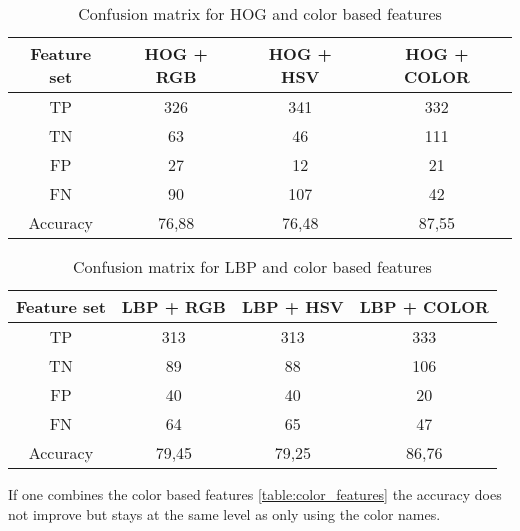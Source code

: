\FloatBarrier
\begin{table}[h!]
	\begin{center}
		\caption{Confusion matrix for HOG and color based features}
		\begin{tabular}{|c|c|c|c|}
			\hline
			Feature set & HOG + RGB & HOG + HSV & HOG + COLOR \\ \hline
			    TP      &    326    &    341    &     332     \\ \hline
			    TN      &    63     &    46     &     111     \\ \hline
			    FP      &    27     &    12     &     21      \\ \hline
			    FN      &    90     &    107    &     42      \\ \hline
			 Accuracy   &   76,88   &   76,48   &    87,55    \\ \hline
		\end{tabular}
		
		\label{table:hog_features}
	\end{center}
\end{table}
\FloatBarrier

\FloatBarrier
\begin{table}[h!]
	\begin{center}
		\caption{Confusion matrix for LBP and color based features}
		\begin{tabular}{|c|c|c|c|}
			\hline
			Feature set & LBP + RGB & LBP + HSV & LBP + COLOR   \\ \hline
			    TP      &    313    &    313    &     333       \\ \hline
			    TN      &    89     &    88     &     106       \\ \hline
			    FP      &    40     &    40     &     20        \\ \hline
			    FN      &    64     &    65     &     47        \\ \hline
			 Accuracy   &   79,45   &   79,25   &    86,76      \\ \hline
		\end{tabular}
		\label{table:lbp_features}
	\end{center}
\end{table}
\FloatBarrier

If one combines the color based features \cref{table:color_features} the accuracy does not improve but stays at the same level as only using the color names. 

